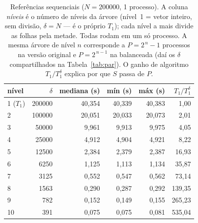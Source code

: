 \documentclass[10pt]{article}
\begin{document}
\begin{table}[htbp]\centering\footnotesize
\caption{Referências sequenciais ($N{=}200000$, 1 processo). A coluna \emph{níveis} é o número de níveis
da árvore (nível~1 = vetor inteiro, sem divisão, $\delta=N$ --- é o próprio $T_1$); cada nível a mais
divide as folhas pela metade. Todas rodam em um só processo. A mesma árvore de nível $n$ corresponde a
$P=2^{\,n}-1$ processos na versão original e $P=2^{\,n-1}$ na balanceada (daí os $\delta$ compartilhados
na Tabela~\ref{tab:par}). O ganho de algoritmo $T_1/T_1^{\delta}$ explica por que
$S$ passa de $P$.}
\label{tab:seq}
\begin{tabular}{l r r r r r}
\toprule
nível & $\delta$ & mediana (s) & mín (s) & máx (s) & $T_1/T_1^{\delta}$\\
\midrule
1 ($T_1$) & 200000 & 40,354 & 40,339 & 40,383 &   1,00\\
2         & 100000 & 20,051 & 20,033 & 20,073 &   2,01\\
3         & 50000  &  9,961 &  9,913 &  9,975 &   4,05\\
4         & 25000  &  4,912 &  4,904 &  4,921 &   8,22\\
5         & 12500  &  2,384 &  2,379 &  2,387 &  16,93\\
6         & 6250   &  1,125 &  1,113 &  1,134 &  35,87\\
7         & 3125   &  0,552 &  0,547 &  0,562 &  73,14\\
8         & 1563   &  0,290 &  0,287 &  0,292 & 139,35\\
9         & 782    &  0,152 &  0,149 &  0,155 & 265,23\\
10        & 391    &  0,075 &  0,075 &  0,081 & 535,04\\
\bottomrule
\end{tabular}
\end{table}
\end{document}
